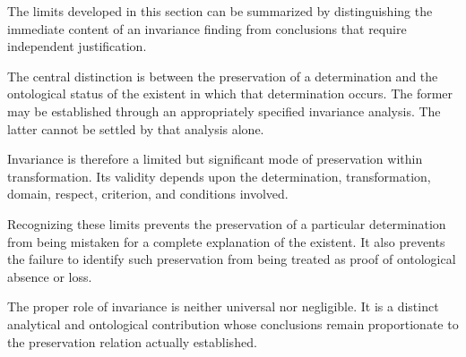 The limits developed in this section can be summarized
by distinguishing the immediate content of an
invariance finding from conclusions that require
independent justification.



The central distinction is between the preservation
of a determination and the ontological status of
the existent in which that determination occurs.
The former may be established through an appropriately
specified invariance analysis. The latter cannot
be settled by that analysis alone.

Invariance is therefore a limited but significant
mode of preservation within transformation. Its
validity depends upon the determination, transformation,
domain, respect, criterion, and conditions involved.

Recognizing these limits prevents the preservation
of a particular determination from being mistaken
for a complete explanation of the existent. It also
prevents the failure to identify such preservation
from being treated as proof of ontological absence
or loss.

The proper role of invariance is neither universal
nor negligible. It is a distinct analytical and
ontological contribution whose conclusions remain
proportionate to the preservation relation actually
established.

